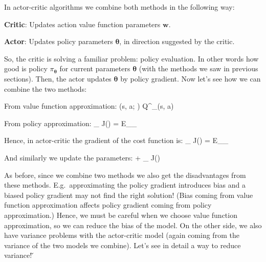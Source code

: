 \vspace{-10pt}

In actor-critic algorithms we combine both methods in the following way:
\bit
\item \textbf{Critic}: Updates action value function parameters $\boldsymbol{w}$.
\item \textbf{Actor}: Updates policy parameters $\boldsymbol{\theta}$, in direction suggested by the critic.
\eit

So, the critic is solving a familiar problem: policy evaluation. In other words how good is policy
$\pi_{\boldsymbol{\theta}}$ for current parameters $\boldsymbol{\theta}$ (with the methods we saw in previous
sections). Then, the actor updates $\boldsymbol{\theta}$ by policy gradient. Now let's see how we can combine the
two methods:
\bit
\item From value function approximation:
\bse
{}(s, a; ) \approx Q^{\pi_{\boldsymbol{\theta}}}(s, a)
\ese

\item From policy approximation:
\bse
\nabla_{\boldsymbol{\theta}} J(\boldsymbol{\theta}) = E_{\pi_{\boldsymbol{\theta}}} 
\ese
\eit

Hence, in actor-critic the gradient of the cost function is:
\bse
\nabla_{\boldsymbol{\theta}} J(\boldsymbol{\theta}) = E_{\pi_{\boldsymbol{\theta}}} 
\ese

And similarly we update the parameters:
\bse
\boldsymbol{\theta} \coloneqq \boldsymbol{\theta} + \alpha \nabla_{\boldsymbol{\theta}} J(\boldsymbol{\theta})
\ese

As before, since we combine two methods we also get the disadvantages from these methods. E.g.\ approximating the
policy gradient introduces bias and a biased policy gradient may not find the right solution! (Bias coming from
value function approximation affects policy gradient coming from policy approximation.) Hence, we must be careful
when we choose value function approximation, so we can reduce the bias of the model. On the other side, we also
have variance problems with the actor-critic model (again coming from the variance of the two models we combine).
Let's see in detail a way to reduce variance! \v

